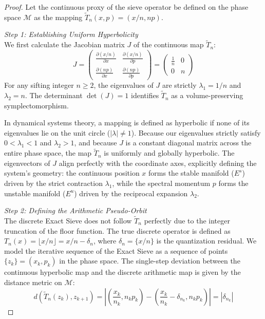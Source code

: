 \documentclass[sn-mathphys-num, pdflatex]{sn-jnl}
\begin{document}
\begin{proof}
Let the continuous proxy of the sieve operator be defined on the phase space $\mathcal{M}$ as the mapping $\tilde{T}_n(x,p) = (x/n, np)$. 

\textit{Step 1: Establishing Uniform Hyperbolicity}\\
We first calculate the Jacobian matrix $J$ of the continuous map $\tilde{T}_n$:
\begin{equation}
\label{Jacob}
J = \begin{pmatrix} \frac{\partial(x/n)}{\partial x} & \frac{\partial(x/n)}{\partial p} \\ \frac{\partial(np)}{\partial x} & \frac{\partial(np)}{\partial p} \end{pmatrix} = \begin{pmatrix} \frac{1}{n} & 0 \\ 0 & n \end{pmatrix}
\end{equation}
For any sifting integer $n \ge 2$, the eigenvalues of $J$ are strictly $\lambda_1 = 1/n$ and $\lambda_2 = n$. The determinant $\det(J) = 1$ identifies $\tilde{T}_n$ as a volume-preserving symplectomorphism. 

In dynamical systems theory, a mapping is defined as hyperbolic if none of its eigenvalues lie on the unit circle ($|\lambda| \neq 1$). Because our eigenvalues strictly satisfy $0 < \lambda_1 < 1$ and $\lambda_2 > 1$, and because $J$ is a constant diagonal matrix across the entire phase space, the map $\tilde{T}_n$ is uniformly and globally hyperbolic. The eigenvectors of $J$ align perfectly with the coordinate axes, explicitly defining the system's geometry: the continuous position $x$ forms the stable manifold ($E^s$) driven by the strict contraction $\lambda_1$, while the spectral momentum $p$ forms the unstable manifold ($E^u$) driven by the reciprocal expansion $\lambda_2$.

\textit{Step 2: Defining the Arithmetic Pseudo-Orbit}\\
The discrete Exact Sieve does not follow $\tilde{T}_n$ perfectly due to the integer truncation of the floor function. The true discrete operator is defined as $T_n(x) = \lfloor x/n \rfloor = x/n - \delta_n$, where $\delta_n = \{x/n\}$ is the quantization residual.
We model the iterative sequence of the Exact Sieve as a sequence of points $\{z_k\} = (x_k, p_k)$ in the phase space. The single-step deviation between the continuous hyperbolic map and the discrete arithmetic map is given by the distance metric on $\mathcal{M}$:
\begin{equation}
d(\tilde{T}_n(z_k), z_{k+1}) = \left| \left( \frac{x_k}{n_k}, n_k p_k \right) - \left( \frac{x_k}{n_k} - \delta_{n_k}, n_k p_k \right) \right| = |\delta_{n_k}|
\end{equation}


\end{proof}
\end{document}
